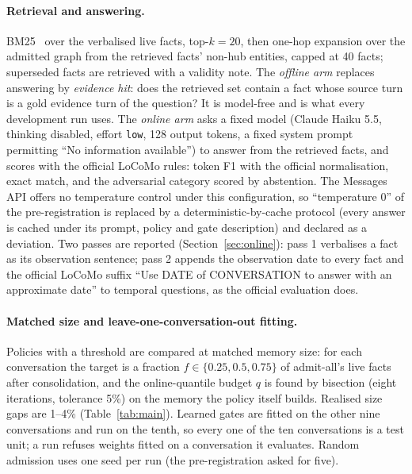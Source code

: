 \documentclass{ceurart}
\newcommand{\code}[1]{\texttt{#1}}
\begin{document}
\paragraph{Retrieval and answering.} BM25~\cite{robertson2009bm25} over the verbalised live facts, top-$k=20$, then one-hop expansion over the admitted graph from the retrieved facts' non-hub entities, capped at 40 facts; superseded facts are retrieved with a validity note. The \emph{offline arm} replaces answering by \emph{evidence hit}: does the retrieved set contain a fact whose source turn is a gold evidence turn of the question? It is model-free and is what every development run uses. The \emph{online arm} asks a fixed model (Claude Haiku 5.5, thinking disabled, effort \code{low}, 128 output tokens, a fixed system prompt permitting ``No information available'') to answer from the retrieved facts, and scores with the official LoCoMo rules: token F1 with the official normalisation, exact match, and the adversarial category scored by abstention. The Messages API offers no temperature control under this configuration, so ``temperature 0'' of the pre-registration is replaced by a deterministic-by-cache protocol (every answer is cached under its prompt, policy and gate description) and declared as a deviation. Two passes are reported (Section~\ref{sec:online}): pass 1 verbalises a fact as its observation sentence; pass 2 appends the observation date to every fact and the official LoCoMo suffix ``Use DATE of CONVERSATION to answer with an approximate date'' to temporal questions, as the official evaluation does.

\paragraph{Matched size and leave-one-conversation-out fitting.}
\label{sec:matched-design}
Policies with a threshold are compared at matched memory size: for each conversation the target is a fraction $f\in\{0.25,0.5,0.75\}$ of admit-all's live facts after consolidation, and the online-quantile budget $q$ is found by bisection (eight iterations, tolerance 5\%) on the memory the policy itself builds. Realised size gaps are 1--4\% (Table~\ref{tab:main}). Learned gates are fitted on the other nine conversations and run on the tenth, so every one of the ten conversations is a test unit; a run refuses weights fitted on a conversation it evaluates. Random admission uses one seed per run (the pre-registration asked for five).
\end{document}

